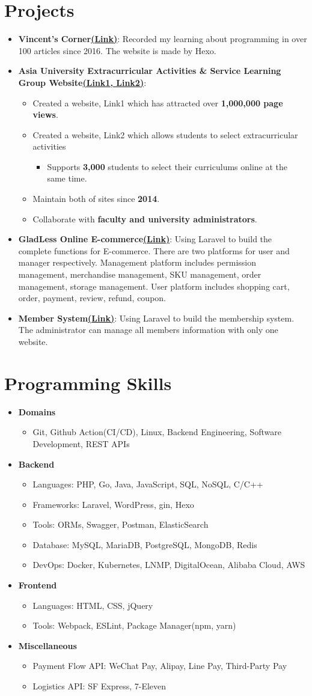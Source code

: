 \documentclass[letterpaper,11pt]{article}
\newcommand{\resumeItem}[2]{
  \item\small{
    \textbf{#1}{: #2 \vspace{-2pt}}
  }
}
\newcommand{\keyItem}[1]{
  \item {
      {#1 \vspace{-2pt}}
  }
}
\newcommand{\keyResultItem}[2]{
  \item {
    {#1 \vspace{-2pt}}
    \begin{itemize}
      \item {#2 \vspace{-2pt}}
    \end{itemize}
  }
}
\newcommand{\resumeSubItem}[2]{\resumeItem{#1}{#2}\vspace{-4pt}}
\newcommand{\resumeSubHeadingListStart}{\begin{itemize}[leftmargin=*]}
\newcommand{\resumeSubHeadingListEnd}{\end{itemize}}
\newcommand{\resumeItemListStart}{\begin{itemize}}
\newcommand{\resumeItemListEnd}{\end{itemize}\vspace{-5pt}}
\begin{document}
\section{Projects}
  \resumeSubHeadingListStart
    \resumeSubItem{Vincent's Corner\href{https://vincent.fishboneapps.com/}{(\underline{Link})}}
      {Recorded my learning about programming in over 100 articles since 2016. The website is made by Hexo.}
    \resumeSubItem{Asia University Extracurricular Activities \& Service Learning Group Website\href{https://sls.asia.edu.tw/}{(\underline{Link1}, }\href{https://elective.easls.asia/}{\underline{Link2})}}
      {}
      \resumeItemListStart
        \keyItem{Created a website, Link1 which has attracted over \textbf{1,000,000 page views}.}
        \keyResultItem{Created a website, Link2 which allows students to select extracurricular activities}{Supports \textbf{3,000} students to select their curriculums online at the same time.}
        \keyItem{Maintain both of sites since \textbf{2014}.}
        \keyItem{Collaborate with \textbf{faculty and university administrators}.}
      \resumeItemListEnd
    \resumeSubItem{GladLess Online E-commerce\href{https://gladless.com/}{(\underline{Link})}}
      {Using Laravel to build the complete functions for E-commerce. There are two platforms for user and manager respectively. Management platform includes permission management, merchandise management, SKU management, order management, storage management. User platform includes shopping cart, order, payment, review, refund, coupon.}
    \resumeSubItem{Member System\href{https://member.tatcmf.org.tw/}{(\underline{Link})}}
      {Using Laravel to build the membership system. The administrator can manage all members information with only one website.}
  \resumeSubHeadingListEnd


\section{Programming Skills}
  \resumeSubHeadingListStart
    \keyItem{\textbf{Domains}}
      \resumeItemListStart
        \keyItem{Git, Github Action(CI/CD), Linux, Backend Engineering, Software Development, REST APIs}
      \resumeItemListEnd
    \keyItem{\textbf{Backend}}
      \resumeItemListStart
        \keyItem{Languages: PHP, Go, Java, JavaScript, SQL, NoSQL, C/C++}
        \keyItem{Frameworks: Laravel, WordPress, gin, Hexo}
        \keyItem{Tools: ORMs, Swagger, Postman, ElasticSearch}
        \keyItem{Database: MySQL, MariaDB, PostgreSQL, MongoDB, Redis}
        \keyItem{DevOps: Docker, Kubernetes, LNMP, DigitalOcean, Alibaba Cloud, AWS}
      \resumeItemListEnd
    \keyItem{\textbf{Frontend}}
      \resumeItemListStart
        \keyItem{Languages: HTML, CSS, jQuery}
        \keyItem{Tools: Webpack, ESLint, Package Manager(npm, yarn)}
      \resumeItemListEnd
    \keyItem{\textbf{Miscellaneous}}
      \resumeItemListStart
        \keyItem{Payment Flow API: WeChat Pay, Alipay, Line Pay, Third-Party Pay}
        \keyItem{Logistics API: SF Express, 7-Eleven}
      \resumeItemListEnd
  \resumeSubHeadingListEnd
\end{document}
